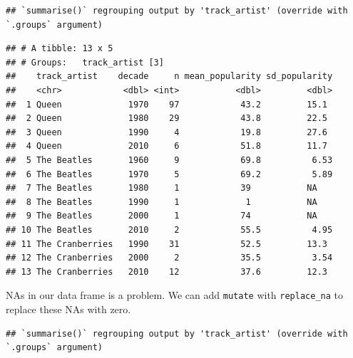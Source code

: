 \documentclass[
]{book}
\newenvironment{Shaded}{\begin{snugshade}}{\end{snugshade}}
\newcommand{\DataTypeTok}[1]{\textcolor[rgb]{0.13,0.29,0.53}{#1}}
\newcommand{\DecValTok}[1]{\textcolor[rgb]{0.00,0.00,0.81}{#1}}
\newcommand{\KeywordTok}[1]{\textcolor[rgb]{0.13,0.29,0.53}{\textbf{#1}}}
\newcommand{\NormalTok}[1]{#1}
\newcommand{\OperatorTok}[1]{\textcolor[rgb]{0.81,0.36,0.00}{\textbf{#1}}}
\newcommand{\StringTok}[1]{\textcolor[rgb]{0.31,0.60,0.02}{#1}}
\begin{document}
\begin{verbatim}
## `summarise()` regrouping output by 'track_artist' (override with `.groups` argument)
\end{verbatim}

\begin{verbatim}
## # A tibble: 13 x 5
## # Groups:   track_artist [3]
##    track_artist    decade     n mean_popularity sd_popularity
##    <chr>            <dbl> <int>           <dbl>         <dbl>
##  1 Queen             1970    97            43.2         15.1 
##  2 Queen             1980    29            43.8         22.5 
##  3 Queen             1990     4            19.8         27.6 
##  4 Queen             2010     6            51.8         11.7 
##  5 The Beatles       1960     9            69.8          6.53
##  6 The Beatles       1970     5            69.2          5.89
##  7 The Beatles       1980     1            39           NA   
##  8 The Beatles       1990     1             1           NA   
##  9 The Beatles       2000     1            74           NA   
## 10 The Beatles       2010     2            55.5          4.95
## 11 The Cranberries   1990    31            52.5         13.3 
## 12 The Cranberries   2000     2            35.5          3.54
## 13 The Cranberries   2010    12            37.6         12.3
\end{verbatim}

NAs in our data frame is a problem. We can add \texttt{mutate} with \texttt{replace\_na} to replace these NAs with zero.

\begin{Shaded}
\end{Shaded}

\begin{verbatim}
## `summarise()` regrouping output by 'track_artist' (override with `.groups` argument)
\end{verbatim}
\end{document}
